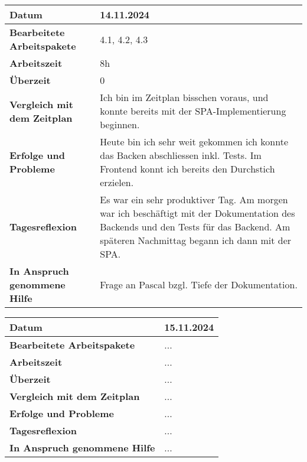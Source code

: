 \begin{longtable}{p{}|p{}}
	\hline
	\textbf{Datum}                       & 14.11.2024 \\
	\hline
	\textbf{Bearbeitete Arbeitspakete}   & 4.1, 4.2, 4.3 \\
	\hline
	\textbf{Arbeitszeit}                 & 8h \\
	\hline
	\textbf{Überzeit}                    & 0 \\
	\hline
	\textbf{Vergleich mit dem Zeitplan}  & Ich bin im Zeitplan bisschen voraus, und konnte bereits mit der SPA-Implementierung beginnen.\\
	\hline
	\textbf{Erfolge und Probleme}        & Heute bin ich sehr weit gekommen ich konnte das Backen abschliessen inkl. Tests. Im Frontend konnt ich bereits den Durchstich erzielen.
	\\
	\hline
	\textbf{Tagesreflexion}              & Es war ein sehr produktiver Tag. Am morgen war ich beschäftigt mit der Dokumentation des Backends und den Tests für das Backend. Am späteren Nachmittag begann ich dann mit der SPA.
	\\
	\hline
	\textbf{In Anspruch genommene Hilfe} & Frage an Pascal bzgl. Tiefe der Dokumentation. \\
	\hline
\end{longtable}\label{tab:arbeitsprotokoll-tag6}
\newpage

\begin{longtable}{p{}|p{}}
	\hline
	\textbf{Datum}                       & 15.11.2024 \\
	\hline
	\textbf{Bearbeitete Arbeitspakete}   & ... \\
	\hline
	\textbf{Arbeitszeit}                 & ... \\
	\hline
	\textbf{Überzeit}                    & ... \\
	\hline
	\textbf{Vergleich mit dem Zeitplan}  & ... \\
	\hline
	\textbf{Erfolge und Probleme}        & ...
	\\
	\hline
	\textbf{Tagesreflexion}              & ...
	\\
	\hline
	\textbf{In Anspruch genommene Hilfe} & ... \\
	\hline
\end{longtable}\label{tab:arbeitsprotokoll-tag7}
\newpage


